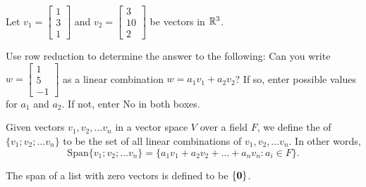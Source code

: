 



Let $v_1 = \left[\begin{array}{c} 1 \\ 3  \\ 1 \end{array} \right]$ and  
$v_2 = \left[\begin{array}{c} 3 \\ 10  \\ 2 \end{array} \right]$  be vectors in $\mathbb R^3$.

Use row reduction to determine the answer to the following: 
Can you write $w = \left[\begin{array}{c} 1 \\ 5 \\ -1 \end{array} \right]$
as a linear combination $w = a_1 v_1 + a_2 v_2$?  If so, enter possible values for $a_1$ and
$a_2$.  If not, enter No in both boxes.  



\edXsolution{ 
}


\endedxproblem

\endedxvertical





\endedxvertical




Given vectors $v_1, v_2, \ldots v_n$ in a vector space $V$ over a field $F$, we define
the {} of $\{v_1; v_2; \ldots v_n\}$ to be the set of all linear combinations
of  $v_1, v_2, \ldots v_n$.  In other words, 
\[ \mathrm{Span}\{v_1; v_2; \ldots v_n\} = \{a_1 v_1  + a_2 v_2 + \ldots + a_nv_n  : a_i \in F \}.\]

The span of a list with zero vectors is defined to be $\{\mathbf{0}\}$.  


\endedxtext





